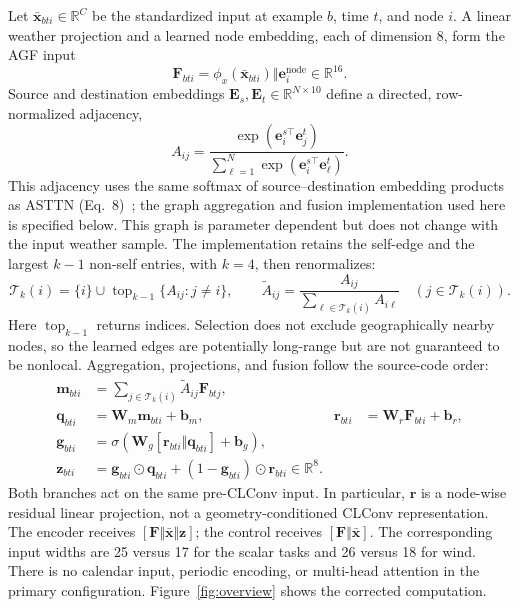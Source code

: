 \documentclass[fleqn,10pt]{wlscirep}
\begin{document}
Let $\bar{\mathbf{x}}_{bti}\in\mathbb{R}^{C}$ be the standardized input at
example $b$, time $t$, and node $i$. A linear weather projection and a learned
node embedding, each of dimension 8, form the AGF input
\begin{equation}
\mathbf{F}_{bti}=\phi_x(\bar{\mathbf{x}}_{bti})\Vert\mathbf{e}^{\mathrm{node}}_i
\in\mathbb{R}^{16}.
\label{eq:agf_input}
\end{equation}
Source and destination embeddings $\mathbf{E}_s,\mathbf{E}_t\in\mathbb{R}^{N\times10}$
define a directed, row-normalized adjacency,
\begin{equation}
A_{ij}=\frac{\exp(\mathbf{e}^{s\top}_i\mathbf{e}^t_j)}
{\sum_{\ell=1}^N\exp(\mathbf{e}^{s\top}_i\mathbf{e}^t_\ell)}.
\label{eq:adaptive_adjacency}
\end{equation}
This adjacency uses the same softmax of source--destination embedding
products as ASTTN (Eq.~8)~\cite{feng2022adaptive}; the graph aggregation
and fusion implementation used here is specified below.
This graph is parameter dependent but does not change with the input
weather sample. The implementation retains the self-edge and the largest
$k-1$ non-self entries, with $k=4$, then renormalizes:
\begin{equation}
\mathcal{T}_k(i)=\{i\}\cup\operatorname{top}_{k-1}\{A_{ij}:j\ne i\},
\qquad
\widetilde A_{ij}=\frac{A_{ij}}{\sum_{\ell\in\mathcal{T}_k(i)}A_{i\ell}}
\quad(j\in\mathcal{T}_k(i)).
\label{eq:topk_normalization}
\end{equation}
Here $\operatorname{top}_{k-1}$ returns indices. Selection does not exclude
geographically nearby nodes, so the learned edges are potentially long-range
but are not guaranteed to be nonlocal.
Aggregation, projections, and fusion follow the source-code order:
\begin{align}
\mathbf{m}_{bti}&=\sum_{j\in\mathcal{T}_k(i)}\widetilde A_{ij}\mathbf{F}_{btj},\\
\mathbf{q}_{bti}&=\mathbf{W}_m\mathbf{m}_{bti}+\mathbf{b}_m,
&\mathbf{r}_{bti}&=\mathbf{W}_r\mathbf{F}_{bti}+\mathbf{b}_r,\\
\mathbf{g}_{bti}&=\sigma\left(\mathbf{W}_g[\mathbf{r}_{bti}\Vert\mathbf{q}_{bti}]
+\mathbf{b}_g\right),\\
\mathbf{z}_{bti}&=\mathbf{g}_{bti}\odot\mathbf{q}_{bti}
+(1-\mathbf{g}_{bti})\odot\mathbf{r}_{bti}\in\mathbb{R}^{8}.
\label{eq:agf_fusion}
\end{align}
Both branches act on the same pre-CLConv input. In particular,
$\mathbf r$ is a node-wise residual linear projection, not a
geometry-conditioned CLConv representation. The encoder receives
$[\mathbf F\Vert\bar{\mathbf x}\Vert\mathbf z]$; the control receives
$[\mathbf F\Vert\bar{\mathbf x}]$. The corresponding input widths are
25 versus 17 for the scalar tasks and 26 versus 18 for wind. There is no
calendar input, periodic encoding, or multi-head attention in the primary
configuration. Figure~\ref{fig:overview} shows the corrected computation.
\end{document}

